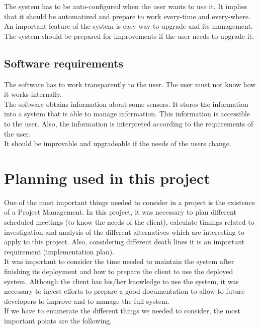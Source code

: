 The system has to be auto-configured when the user wants to use it. It implies that it should be automatized and prepare to work every-time and every-where.\\

An important feature of the system is easy way to upgrade and its management. The system should be prepared for improvements if the user needs to upgrade it.

\subsection{Software requirements}

The software has to work transparently to the user. The user must not know how it works internally.\\

The software obtains information about some sensors. It stores the information into a system that is able to manage information. This information is accessible to the user. Also, the information is interpreted according to the requirements of the user.\\

It should be improvable and upgradeable if the needs of the users change.

\section{Planning used in this project}

One of the most important things needed to consider in a project is the existence of a Project Management. In this project, it was necessary to plan different scheduled meetings (to know the needs of the client), calculate timings related to investigation and analysis of the different alternatives which are interesting to apply to this project. Also, considering different death lines it is an important requirement (implementation plan).\\

It was important to consider the time needed to maintain the system after finishing its deployment and how to prepare the client to use the deployed system. Although the client has his/her knowledge to use the system, it was necessary to invest  efforts to prepare a good documentation to allow to future developers to improve and to manage the full system.\\

If we have to enumerate the different things we needed to consider, the most important points are the following.

